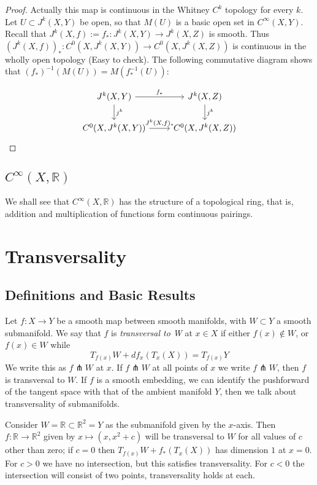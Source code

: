 \documentclass[12pt]{article}
\newcommand{\RR}{\mathbb{R}}
\begin{document}
\begin{proof}
    Actually this map is continuous in the Whitney $C^k$ topology for every $k$. Let $U\subset J^k(X, Y)$ be open, so that $M(U)$ is a basic open set in $C^\infty(X, Y)$. Recall that $J^k(X, f) := f_*: J^k(X, Y) \to J^k(X, Z)$ is smooth. Thus $(J^k(X, f))_*: C^0(X, J^k(X, Y)) \to C^0(X, J^k(X, Z))$ is continuous in the wholly open topology (Easy to check). The following commutative diagram shows that $(f_*)^{-1}(M(U)) = M(f_*^{-1}(U))$: 
    
    $$
    \begin{tikzcd}
        J^k(X, Y) \arrow[r, "f_*"] \arrow[d, "j^k"] & J^k(X, Z) \arrow[d, "j^k"] \\ 
        C^0(X, J^k(X, Y)) \arrow[r, "{J^k(X, f)_*}"] & C^0(X, J^k(X, Z)) 
    \end{tikzcd}
    $$
\end{proof}

\subsection{$C^\infty(X, \RR)$}
We shall see that $C^\infty(X, \RR)$ has the structure of a topological ring, that is, addition and multiplication of functions form continuous pairings. 




\pagebreak

\section{Transversality} \label{transversality section}

\subsection{Definitions and Basic Results}
Let $f: X \to Y$ be a smooth map between smooth manifolds, with $W\subset Y$ a smooth submanifold. We say that $f$ is \emph{transversal to W} at $x\in X$ if either $f(x) \not \in W$, or $f(x) \in W$ while 
$$
T_{f(x)} W + df_x(T_x(X)) = T_{f(x)} Y
$$
We write this as $f\pitchfork W$ at $x$. If $f\pitchfork W$ at all points of $x$ we write $f\pitchfork W$, then $f$ is transversal to $W$. If $f$ is a smooth embedding, we can identify the pushforward of the tangent space with that of the ambient manifold $Y$, then we talk about transversality of submanifolds. 

\begin{example}
    Consider $W = \RR \subset \RR^2 = Y$ as the submanifold given by the $x$-axis. Then $f: \RR \to \RR^2$ given by $x \mapsto (x, x^2 + c)$ will be transversal to $W$ for all values of $c$ other than zero; if $c=0$ then $T_{f(x)} W + f_*(T_x(X))$ has dimension $1$ at $x=0$. For $c>0$ we have no intersection, but this satisfies transversality. For $c<0$ the intersection will consist of two points, transversality holds at each. \par 
\end{example}
\end{document}

